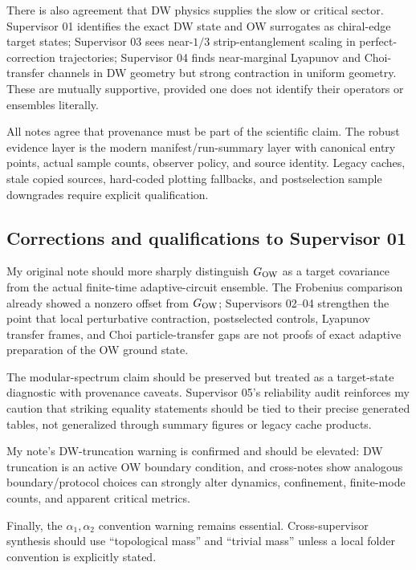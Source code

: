 \documentclass[aps,prb,onecolumn,nofootinbib,superscriptaddress]{revtex4-2}
\newcommand{\GO}{G_{\rm OW}}
\begin{document}
There is also agreement that DW physics supplies the slow or critical sector.  Supervisor 01 identifies the exact DW state and OW surrogates as chiral-edge target states; Supervisor 03 sees near-\(1/3\) strip-entanglement scaling in perfect-correction trajectories; Supervisor 04 finds near-marginal Lyapunov and Choi-transfer channels in DW geometry but strong contraction in uniform geometry.  These are mutually supportive, provided one does not identify their operators or ensembles literally.

All notes agree that provenance must be part of the scientific claim.  The robust evidence layer is the modern manifest/run-summary layer with canonical entry points, actual sample counts, observer policy, and source identity.  Legacy caches, stale copied sources, hard-coded plotting fallbacks, and postselection sample downgrades require explicit qualification.

\subsection{Corrections and qualifications to Supervisor 01}

My original note should more sharply distinguish \(\GO\) as a target covariance from the actual finite-time adaptive-circuit ensemble.  The Frobenius comparison already showed a nonzero offset from \(\GO\); Supervisors 02--04 strengthen the point that local perturbative contraction, postselected controls, Lyapunov transfer frames, and Choi particle-transfer gaps are not proofs of exact adaptive preparation of the OW ground state.

The modular-spectrum claim should be preserved but treated as a target-state diagnostic with provenance caveats.  Supervisor 05's reliability audit reinforces my caution that striking equality statements should be tied to their precise generated tables, not generalized through summary figures or legacy cache products.

My note's DW-truncation warning is confirmed and should be elevated: DW truncation is an active OW boundary condition, and cross-notes show analogous boundary/protocol choices can strongly alter dynamics, confinement, finite-mode counts, and apparent critical metrics.

Finally, the \(\alpha_1,\alpha_2\) convention warning remains essential.  Cross-supervisor synthesis should use ``topological mass'' and ``trivial mass'' unless a local folder convention is explicitly stated.
\end{document}
